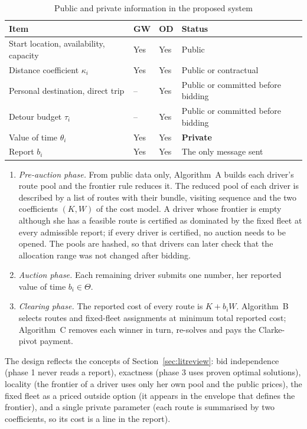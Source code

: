 \begin{table}[t]
\centering
\caption{Public and private information in the proposed system}
\label{tab:publicprivate}
\small
\begin{tabular}{P{6.3cm}P{1.4cm}P{1.4cm}P{4.7cm}}
\toprule
Item & GW & OD & Status\\
\midrule
Start location, availability, capacity & Yes & Yes & Public\\
Distance coefficient $\kappa_i$ & Yes & Yes & Public or contractual\\
Personal destination, direct trip & -- & Yes & Public or committed before bidding\\
Detour budget $\tau_i$ & -- & Yes & Public or committed before bidding\\
Value of time $\theta_i$ & Yes & Yes & \textbf{Private}\\
Report $b_i$ & Yes & Yes & The only message sent\\
\bottomrule
\end{tabular}
\end{table}

\begin{enumerate}[leftmargin=*,itemsep=4pt]
\item \emph{Pre-auction phase.} From public data only, Algorithm~A builds
each driver's route pool and the frontier rule reduces it. The reduced pool
of each driver is described by a list of routes with their bundle, visiting
sequence and the two coefficients $(K,W)$ of the cost model. A driver whose
frontier is empty although she has a feasible route is certified as
dominated by the fixed fleet at every admissible report; if every driver
is certified, no auction needs to be opened. The pools are hashed, so that
drivers can later check that the allocation range was not changed after
bidding.
\item \emph{Auction phase.} Each remaining driver submits one number, her
reported value of time $b_i\in\Theta$.
\item \emph{Clearing phase.} The reported cost of every route is
$K+b_iW$. Algorithm~B selects routes and fixed-fleet assignments at minimum
total reported cost; Algorithm~C removes each winner in turn, re-solves and
pays the Clarke-pivot payment.
\end{enumerate}

The design reflects the concepts of Section~\ref{sec:litreview}: bid
independence (phase 1 never reads a report), exactness (phase 3 uses proven
optimal solutions), locality (the frontier of a driver uses only her own
pool and the public prices), the fixed fleet as a priced outside option
(it appears in the envelope that defines the frontier), and a single private
parameter (each route is summarised by two coefficients, so its cost is a
line in the report).

